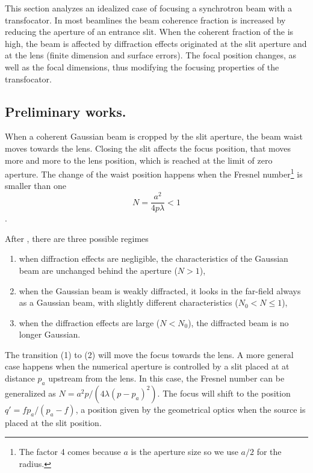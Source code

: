 \documentclass{iucr}              %
\begin{document}
This section analyzes an idealized case of focusing a synchrotron beam with a transfocator. In most beamlines the beam coherence fraction is increased by reducing the aperture of an entrance slit. When the coherent fraction of the is high, the beam is affected by diffraction effects originated at the slit aperture and at the lens (finite dimension and surface errors). The focal position changes, as well as the focal dimensions, thus modifying the focusing properties of the transfocator. 

\subsection{Preliminary works.}

When a coherent Gaussian beam is cropped by the slit aperture, the beam waist moves towards the lens. Closing the slit affects the focus position, that moves more and more to the lens position, which is reached at the limit of zero aperture. The change of the waist position happens when the Fresnel number\footnote{The factor 4 comes because $a$ is the aperture size so we use $a/2$ for the radius.} is smaller than one
\begin{equation}
    N = \frac{a^2}{4 p \lambda}  < 1
\end{equation}. 

After \cite{Belland:82}, there are three possible regimes 
\begin{enumerate}
\item when diffraction effects are negligible, the
characteristics of the Gaussian beam are unchanged
behind the aperture ($N>1$),
\item when the Gaussian
beam is weakly diffracted, it looks in the far-field always as a Gaussian beam, with slightly different characteristics ($N_0<N \le 1$),
\item when the diffraction effects are large ($N<N_0$),
the diffracted beam is no longer Gaussian.
\end{enumerate}

The transition (1) to (2) will move the focus towards the lens. A more general case happens when the numerical aperture is controlled by a slit placed at at distance $p_a$ upstream from the lens. 
In this case, the Fresnel number can be generalized as $N=a^2 p / (4 \lambda (p-p_a)^2)$. The focus will shift to the position $q'=f p_a/(p_a-f)$, a position given by the geometrical optics when the source is placed at the slit position. 
\end{document}
